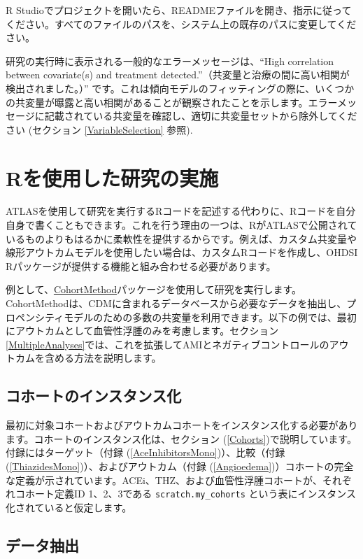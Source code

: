 \documentclass[
  11pt]{book}
\theoremstyle{definition}
\theoremstyle{definition}
\theoremstyle{definition}
\theoremstyle{definition}
\theoremstyle{remark}
\begin{document}
R Studioでプロジェクトを開いたら、READMEファイルを開き、指示に従ってください。すべてのファイルのパスを、システム上の既存のパスに変更してください。

研究の実行時に表示される一般的なエラーメッセージは、``High correlation between covariate(s) and treatment detected.''（共変量と治療の間に高い相関が検出されました。）'' です。これは傾向モデルのフィッティングの際に、いくつかの共変量が曝露と高い相関があることが観察されたことを示します。エラーメッセージに記載されている共変量を確認し、適切に共変量セットから除外してください (セクション \ref{VariableSelection} 参照). 

\section{Rを使用した研究の実施}\label{pleR}

ATLASを使用して研究を実行するRコードを記述する代わりに、Rコードを自分自身で書くこともできます。これを行う理由の一つは、RがATLASで公開されているものよりもはるかに柔軟性を提供するからです。例えば、カスタム共変量や線形アウトカムモデルを使用したい場合は、カスタムRコードを作成し、OHDSI Rパッケージが提供する機能と組み合わせる必要があります。

例として、\href{https://ohdsi.github.io/CohortMethod/}{CohortMethod}パッケージを使用して研究を実行します。CohortMethodは、CDMに含まれるデータベースから必要なデータを抽出し、プロペンシティモデルのための多数の共変量を利用できます。以下の例では、最初にアウトカムとして血管性浮腫のみを考慮します。セクション \ref{MultipleAnalyses}では、これを拡張してAMIとネガティブコントロールのアウトカムを含める方法を説明します。

\subsection{コホートのインスタンス化}\label{ux30b3ux30dbux30fcux30c8ux306eux30a4ux30f3ux30b9ux30bfux30f3ux30b9ux5316-1}

最初に対象コホートおよびアウトカムコホートをインスタンス化する必要があります。コホートのインスタンス化は、セクション (\ref{Cohorts})で説明しています。付録にはターゲット（付録 (\ref{AceInhibitorsMono})）、比較（付録 (\ref{ThiazidesMono})）、およびアウトカム（付録 (\ref{Angioedema})）コホートの完全な定義が示されています。ACEi、THZ、および血管性浮腫コホートが、それぞれコホート定義ID 1、2、3である \texttt{scratch.my\_cohorts} という表にインスタンス化されていると仮定します。

\subsection{データ抽出}\label{ux30c7ux30fcux30bfux62bdux51fa-1}
\end{document}
